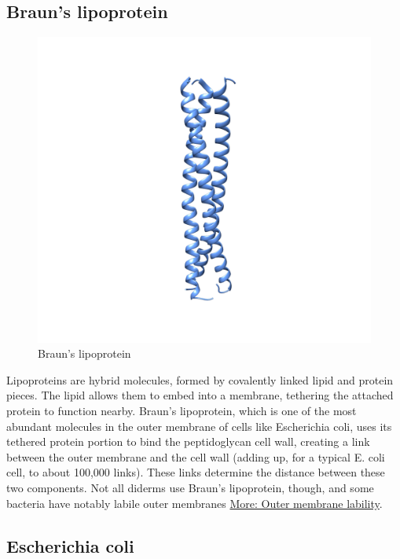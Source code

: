 \documentclass[]{tufte-book}
\begin{document}
\subsection{Braun's lipoprotein}\label{brauns-lipoprotein}

\begin{figure}
\includegraphics{img/02_schematic/2_3_1_BLP} \caption[Braun's lipoprotein]{Braun's lipoprotein}\label{fig:2-3-1}
\end{figure}

Lipoproteins are hybrid molecules, formed by covalently linked lipid and
protein pieces. The lipid allows them to embed into a membrane,
tethering the attached protein to function nearby. Braun's lipoprotein,
which is one of the most abundant molecules in the outer membrane of
cells like Escherichia coli, uses its tethered protein portion to bind
the peptidoglycan cell wall, creating a link between the outer membrane
and the cell wall (adding up, for a typical E. coli cell, to about
100,000 links). These links determine the distance between these two
components. Not all diderms use Braun's lipoprotein, though, and some
bacteria have notably labile outer membranes \protect\hyperlink{}{More:
Outer membrane lability}.

\hypertarget{Diderm_sacculus_architecture}{\subsection{Escherichia
coli}\label{Diderm_sacculus_architecture}}
\end{document}
